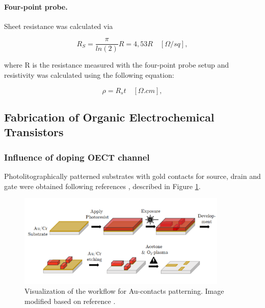\paragraph{Four-point probe.}Sheet resistance was calculated via

\begin{equation}\label{eq:rs}
	R_{S} = \frac{\pi}{ln(2)}R = 4,53 R \quad [\Omega/sq],
\end{equation}

where R is the resistance measured with the four-point probe setup and resistivity was calculated using the following equation:

\begin{equation}\label{eq:resist}
	\rho = R_{s}t \quad [\Omega.cm],
\end{equation}
 

\subsection{Fabrication of Organic Electrochemical Transistors}

\subsubsection{Influence of doping OECT channel} \label{subsec:photo}

Photolitographically patterned substrates with gold contacts for source, drain and gate were obtained following references \cite{weissbachPhotopatternableSolidElectrolyte2022}\cite{bongartzOrganicElectrochemicalTransistors2021}, described in Figure \ref{fig:aupat}.

\begin{figure}[ht]
	\centering
	\includegraphics[width=10cm]{Images/pdf/Au-patterning.pdf}
	\caption[Visualization of the workflow for Au-contacts patterning.]{Visualization of the workflow for Au-contacts patterning. Image modified based on reference \cite{bongartzOrganicElectrochemicalTransistors2021}.}
	\label{fig:aupat}
\end{figure}

